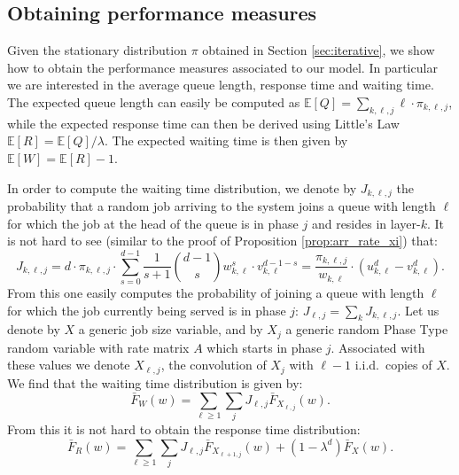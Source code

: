 \documentclass[12pt]{report}
\newcommand{\E}{\mathbb{E}}
\begin{document}
\subsection{Obtaining performance measures}
Given the stationary distribution $\pi$ obtained in Section \ref{sec:iterative}, we show how to obtain the performance measures associated to our model. In particular we are interested in the average queue length, response time and waiting time. The expected queue length can easily be computed as $\E[Q]=\sum_{k,\ell,j} \ell \cdot \pi_{k,\ell,j}$, while the expected response time can then be derived using Little's Law $\E[R]=\E[Q]/\lambda$. The expected waiting time is then given by $\E[W]=\E[R]-1$.

In order to compute the waiting time distribution, we denote by $J_{k,\ell,j}$ the probability that a random job arriving to the system joins a queue with length $\ell$ for which the job at the head of the queue is in phase $j$ and resides in layer-$k$. It is not hard to see (similar to the proof of Proposition \ref{prop:arr_rate_xi}) that:
\begin{equation} \label{eq:Jkellj}
J_{k, \ell, j} = d\cdot \pi_{k,\ell,j} \cdot \sum_{s=0}^{d-1} \frac{1}{s+1} \binom{d-1}{s} w_{k,\ell}^{s} \cdot v_{k, \ell}^{d-1-s} = \frac{\pi_{k, \ell, j}}{w_{k, \ell}} \cdot \left( u_{k, \ell}^d - v_{k, \ell}^d \right).
\end{equation}
From this one easily computes the probability of joining a queue with length $\ell$ for which the job currently being served is in phase $j$: $J_{\ell, j} = \sum_k J_{k,\ell,j}$. Let us denote by $X$ a generic job size variable, and by $X_j$ a generic random Phase Type random variable with rate matrix $A$ which starts in phase $j$. Associated with these values we denote $X_{\ell,j}$, the convolution of $X_j$ with $\ell-1$ i.i.d.~copies of $X$.  We find that the waiting time distribution is given by:
\begin{equation}\label{eq:FWbar}
\bar F_W(w)
=
\sum_{\ell \geq 1} \sum_{j} J_{\ell, j} \bar F_{X_{\ell,j}}(w).
\end{equation}
From this it is not hard to obtain the response time distribution:
\begin{equation} \label{eq:FRbar}
\bar F_R(w)=\sum_{\ell \geq 1} \sum_{j} J_{\ell, j} \bar F_{X_{\ell+1,j}}(w) + (1-\lambda^d) \bar F_X(w).
\end{equation}
\end{document}
